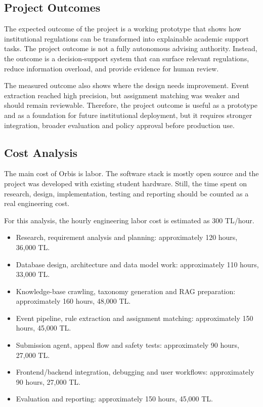 \documentclass[a4paper,12pt]{article}
\begin{document}
\subsection{Project Outcomes}
The expected outcome of the project is a working prototype that shows how institutional regulations can be transformed into explainable academic support tasks. The project outcome is not a fully autonomous advising authority. Instead, the outcome is a decision-support system that can surface relevant regulations, reduce information overload, and provide evidence for human review.

The measured outcome also shows where the design needs improvement. Event extraction reached high precision, but assignment matching was weaker and should remain reviewable. Therefore, the project outcome is useful as a prototype and as a foundation for future institutional deployment, but it requires stronger integration, broader evaluation and policy approval before production use.

\subsection{Cost Analysis}
The main cost of Orbis is labor. The software stack is mostly open source and the project was developed with existing student hardware. Still, the time spent on research, design, implementation, testing and reporting should be counted as a real engineering cost.

For this analysis, the hourly engineering labor cost is estimated as 300 TL/hour.

\begin{itemize}
    \item Research, requirement analysis and planning: approximately 120 hours, 36{,}000 TL.
    \item Database design, architecture and data model work: approximately 110 hours, 33{,}000 TL.
    \item Knowledge-base crawling, taxonomy generation and RAG preparation: approximately 160 hours, 48{,}000 TL.
    \item Event pipeline, rule extraction and assignment matching: approximately 150 hours, 45{,}000 TL.
    \item Submission agent, appeal flow and safety tests: approximately 90 hours, 27{,}000 TL.
    \item Frontend/backend integration, debugging and user workflows: approximately 90 hours, 27{,}000 TL.
    \item Evaluation and reporting: approximately 150 hours, 45{,}000 TL.
\end{itemize}
\end{document}
